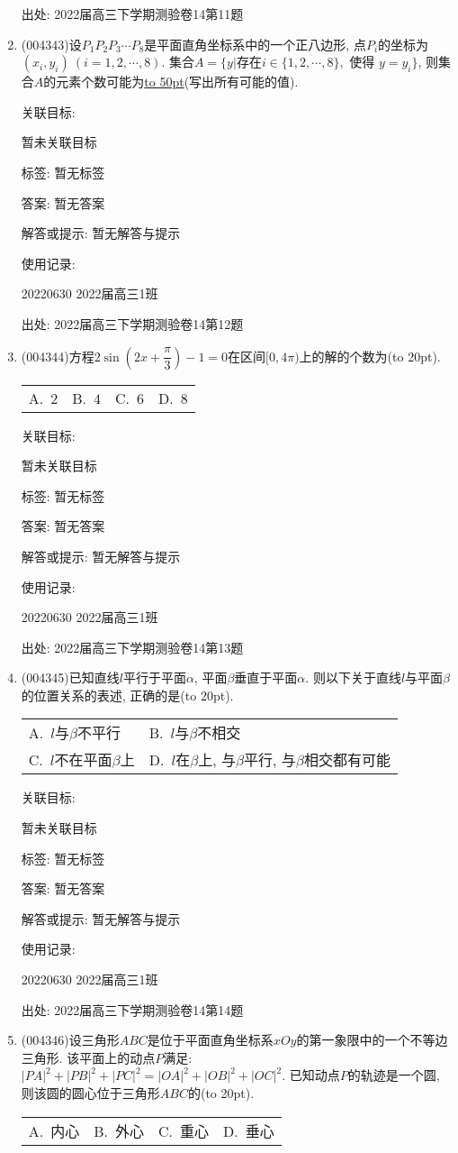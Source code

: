 \documentclass[10pt,a4paper]{article}
\newcommand{\blank}[1]{\underline{\hbox to #1pt{}}}
\newcommand{\bracket}[1]{(\hbox to #1pt{})}
\newcommand{\twoch}[4]{\par\begin{tabular}{p{.46\textwidth}p{.46\textwidth}}
A.~#1& B.~#2\\
C.~#3& D.~#4
\end{tabular}}
\newcommand{\fourch}[4]{\par\begin{tabular}{p{.23\textwidth}p{.23\textwidth}p{.23\textwidth}p{.23\textwidth}}
A.~#1 &B.~#2& C.~#3& D.~#4
\end{tabular}}
\begin{document}
\begin{enumerate}[1.]
出处: 2022届高三下学期测验卷14第11题
\item { (004343)}设$P_1P_2P_3\cdots P_8$是平面直角坐标系中的一个正八边形, 点$P_i$的坐标为$(x_i,y_i) \ (i=1,2,\cdots,8)$. 集合$A=\{y|\text{存在} i\in \{1,2,\cdots,8\},\text{ 使得 }y=y_i\}$, 则集合$A$的元素个数可能为\blank{50}(写出所有可能的值).


关联目标:

暂未关联目标



标签: 暂无标签

答案: 暂无答案

解答或提示: 暂无解答与提示

使用记录:

20220630	2022届高三1班	


出处: 2022届高三下学期测验卷14第12题
\item { (004344)}方程$2\sin (2x+\dfrac{\pi}3)-1=0$在区间$[0,4\pi)$上的解的个数为\bracket{20}.
\fourch{$2$}{$4$}{$6$}{$8$}


关联目标:

暂未关联目标



标签: 暂无标签

答案: 暂无答案

解答或提示: 暂无解答与提示

使用记录:

20220630	2022届高三1班	


出处: 2022届高三下学期测验卷14第13题
\item { (004345)}已知直线$l$平行于平面$\alpha$, 平面$\beta$垂直于平面$\alpha$. 则以下关于直线$l$与平面$\beta$的位置关系的表述, 正确的是\bracket{20}.
\twoch{$l$与$\beta$不平行}{$l$与$\beta$不相交
}{$l$不在平面$\beta$上}{$l$在$\beta$上, 与$\beta$平行, 与$\beta$相交都有可能}


关联目标:

暂未关联目标



标签: 暂无标签

答案: 暂无答案

解答或提示: 暂无解答与提示

使用记录:

20220630	2022届高三1班	


出处: 2022届高三下学期测验卷14第14题
\item { (004346)}设三角形$ABC$是位于平面直角坐标系$xOy$的第一象限中的一个不等边三角形. 该平面上的动点$P$满足: $|PA|^2+|PB|^2+|PC|^2=|OA|^2+|OB|^2+|OC|^2$. 已知动点$P$的轨迹是一个圆, 则该圆的圆心位于三角形$ABC$的\bracket{20}.
\fourch{内心}{外心}{重心}{垂心}



\end{enumerate}
\end{document}
